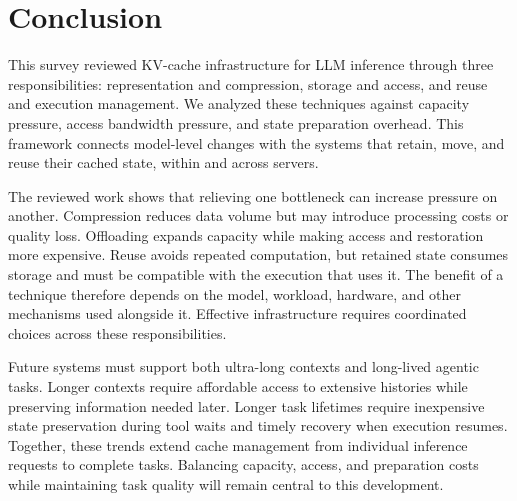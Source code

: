 \chapter{Conclusion}\label{chapter:conclusion}

This survey reviewed KV-cache infrastructure for LLM inference through three responsibilities: representation and compression, storage and access, and reuse and execution management. We analyzed these techniques against capacity pressure, access bandwidth pressure, and state preparation overhead. This framework connects model-level changes with the systems that retain, move, and reuse their cached state, within and across servers.

The reviewed work shows that relieving one bottleneck can increase pressure on another. Compression reduces data volume but may introduce processing costs or quality loss. Offloading expands capacity while making access and restoration more expensive. Reuse avoids repeated computation, but retained state consumes storage and must be compatible with the execution that uses it. The benefit of a technique therefore depends on the model, workload, hardware, and other mechanisms used alongside it. Effective infrastructure requires coordinated choices across these responsibilities.

Future systems must support both ultra-long contexts and long-lived agentic tasks. Longer contexts require affordable access to extensive histories while preserving information needed later. Longer task lifetimes require inexpensive state preservation during tool waits and timely recovery when execution resumes. Together, these trends extend cache management from individual inference requests to complete tasks. Balancing capacity, access, and preparation costs while maintaining task quality will remain central to this development.
